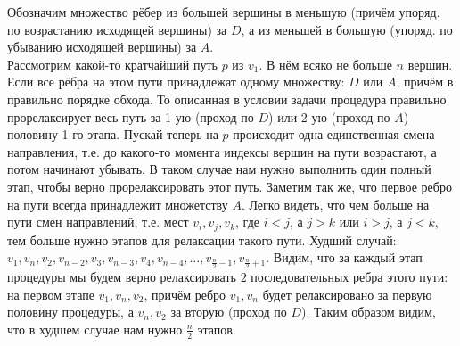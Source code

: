 Обозначим множество рёбер из большей вершины в меньшую (причём упоряд. по возрастанию исходящей вершины) за $D$, 
а из меньшей в большую (упоряд. по убыванию исходящей вершины) за $A$.\\
Рассмотрим какой-то кратчайший путь $p$ из $v_1$. В нём всяко не больше $n$ вершин. Если все рёбра на этом пути принадлежат одному множеству: $D$ или $A$, причём в правильно порядке обхода. То описанная в условии задачи процедура правильно прорелаксирует весь путь за 1-ую (проход по $D$) или 2-ую (проход по $A$) половину 1-го этапа. Пускай теперь на $p$ происходит одна единственная смена направления, т.е. до какого-то момента
индексы вершин на пути возрастают, а потом начинают убывать. В таком случае нам нужно выполнить один полный этап, чтобы верно прорелаксировать этот путь. Заметим так же, что первое ребро на пути всегда принадлежит множетству $A$. Легко видеть, что чем больше на пути смен направлений, т.е. мест $v_i,v_j,v_k$, где $i < j$, а $j > k$ или $i > j$, а $j < k$, тем больше нужно этапов для релаксации такого пути. Худший случай:
$v_1,v_n,v_2,v_{n-2},v_3,v_{n-3},v_4,v_{n-4},\ldots,v_{\frac{n}{2}-1},v_{\frac{n}{2}+1}$. Видим, что за каждый этап процедуры мы будем верно релаксировать $2$ последовательных ребра этого пути:
на первом этапе $v_1,v_n,v_2$, причём ребро $v_1,v_n$ будет релаксировано за первую половину процедуры, а $v_n,v_2$ за вторую (проход по $D$). Таким образом видим, что в худшем случае нам нужно $\frac{n}{2}$ этапов. \xqed
 